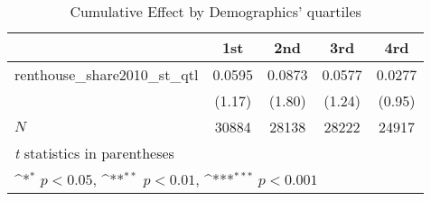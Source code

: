 \begin{table}[htbp]\centering
\def\sym#1{\ifmmode^{#1}\else\(^{#1}\)\fi}
\caption{Cumulative Effect by Demographics' quartiles}
\begin{tabular}{l*{4}{c}}
\hline\hline
            &\multicolumn{1}{c}{1st}&\multicolumn{1}{c}{2nd}&\multicolumn{1}{c}{3rd}&\multicolumn{1}{c}{4rd}\\
\hline
renthouse\_share2010\_st\_qtl&      0.0595         &      0.0873         &      0.0577         &      0.0277         \\
            &      (1.17)         &      (1.80)         &      (1.24)         &      (0.95)         \\
\hline
\(N\)       &       30884         &       28138         &       28222         &       24917         \\
\hline\hline
\multicolumn{5}{l}{\footnotesize \textit{t} statistics in parentheses}\\
\multicolumn{5}{l}{\footnotesize \sym{*} \(p<0.05\), \sym{**} \(p<0.01\), \sym{***} \(p<0.001\)}\\
\end{tabular}
\end{table}
